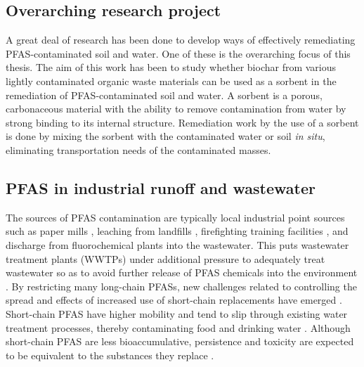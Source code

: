 \subsection{Overarching research project}
A great deal of research has been done to develop ways of effectively remediating PFAS-contaminated soil and water. One of these is the overarching focus of this thesis. The aim of this work has been to study whether biochar from various lightly contaminated organic waste materials can be used as a sorbent in the remediation of PFAS-contaminated soil and water. A sorbent is a porous, carbonaceous material with the ability to remove contamination from water by strong binding to its internal structure. Remediation work by the use of a sorbent is done by mixing the sorbent with the contaminated water or soil \textit{in situ}, eliminating transportation needs of the contaminated masses.  

\subsection{PFAS in industrial runoff and wastewater}
The sources of PFAS contamination are typically local industrial point sources such as paper mills \citep{lee2020legacy,langberg2021paper}, leaching from landfills \citep{masoner2020landfill}, firefighting training facilities \citep{filipovic2015historical}, and discharge from fluorochemical plants \citep{gebbink2017presence} into the wastewater. This puts wastewater treatment plants (WWTPs) under additional pressure  to adequately treat wastewater so as to avoid further release of PFAS chemicals into the environment  \citep{Morin2017flameWaste}. By restricting many long-chain PFASs, new challenges related to controlling the spread and effects of increased use of short-chain replacements have emerged \citep{knutsen2019leachate}. Short-chain PFAS have higher mobility and tend to slip through existing water treatment processes, thereby contaminating food and drinking water \citep{hale2020persistent,brendel2018short}. Although short-chain PFAS are less bioaccumulative, persistence and toxicity are expected to be equivalent to the substances they replace \citep{EC2020PFAS}. 

